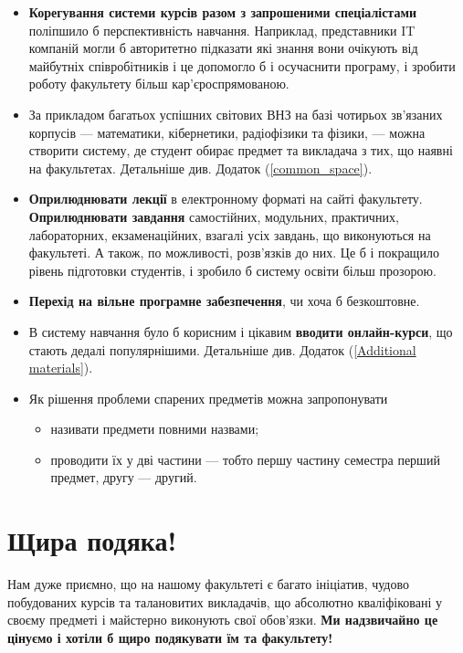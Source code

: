 \documentclass[14pt, a4paper]{extarticle}  %
\begin{document}
\begin{itemize}
    \item  \textbf{Корегування системи курсів разом з  запрошеними спеціалістами} поліпшило б перспективність навчання. Наприклад, представники IT компаній могли б авторитетно підказати які знання вони очікують від майбутніх співробітників і це допомогло б і осучаснити програму, і зробити роботу факультету більш кар'єроспрямо\-ваною.
    
    \item За прикладом багатьох успішних світових ВНЗ на базі чотирьох зв'язаних корпусів --- математики, кібернетики, радіофізики та фізики, --- можна створити систему, де студент обирає предмет та викладача з тих, що наявні на факультетах. Детальніше див. Додаток (\ref{common_space}).
    
    \item  \textbf{Оприлюднювати лекції} в електронному форматі на сайті факультету.
     \textbf{Оприлюднювати завдання} самостійних, модульних, практичних, лабораторних, екзаменаційних, взагалі усіх завдань, що виконуються на факультеті. А також, по можливості, розв'язків до них. Це б і покращило рівень підготовки студентів, і зробило б систему освіти більш прозорою. 
    
    \item \textbf{Перехід на вільне програмне забезпечення}, чи хоча б безкоштовне.
    
    \item В систему навчання було б корисним і цікавим \textbf{вводити онлайн-курси}, що стають дедалі популярнішими. Детальніше див. Додаток (\ref{Additional materials}).
    
    \item Як рішення проблеми спарених предметів можна запропонувати
    \begin{itemize}
        \item називати предмети повними назвами;
        \item проводити їх у дві частини --- тобто першу частину семестра перший предмет, другу --- другий.
    \end{itemize}
\end{itemize}

\newpage
\section{Щира подяка!}
Нам дуже приємно, що на нашому факультеті є багато ініціатив, чудово побудованих курсів та талановитих викладачів, що абсолютно кваліфіковані у своєму предметі і майстерно виконують свої обов'язки. \textbf{Ми надзвичайно це цінуємо і хотіли б щиро подякувати їм та факультету! }\medskip
\end{document}
